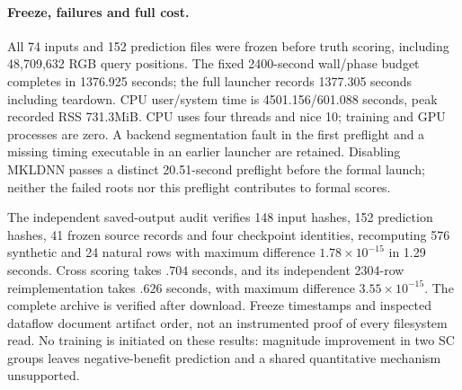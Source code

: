 \paragraph{Freeze, failures and full cost.}
All 74 inputs and 152 prediction files were frozen before truth scoring, including 48,709,632 RGB query positions. The fixed 2400-second wall/phase budget completes in 1376.925 seconds; the full launcher records 1377.305 seconds including teardown. CPU user/system time is 4501.156/601.088 seconds, peak recorded RSS 731.3MiB. CPU uses four threads and nice 10; training and GPU processes are zero. A backend segmentation fault in the first preflight and a missing timing executable in an earlier launcher are retained. Disabling MKLDNN passes a distinct 20.51-second preflight before the formal launch; neither the failed roots nor this preflight contributes to formal scores.

The independent saved-output audit verifies 148 input hashes, 152 prediction hashes, 41 frozen source records and four checkpoint identities, recomputing 576 synthetic and 24 natural rows with maximum difference $1.78\times 10^{-15}$ in 1.29 seconds. Cross scoring takes $.704$ seconds, and its independent 2304-row reimplementation takes $.626$ seconds, with maximum difference $3.55\times 10^{-15}$. The complete archive is verified after download. Freeze timestamps and inspected dataflow document artifact order, not an instrumented proof of every filesystem read. No training is initiated on these results: magnitude improvement in two SC groups leaves negative-benefit prediction and a shared quantitative mechanism unsupported.


